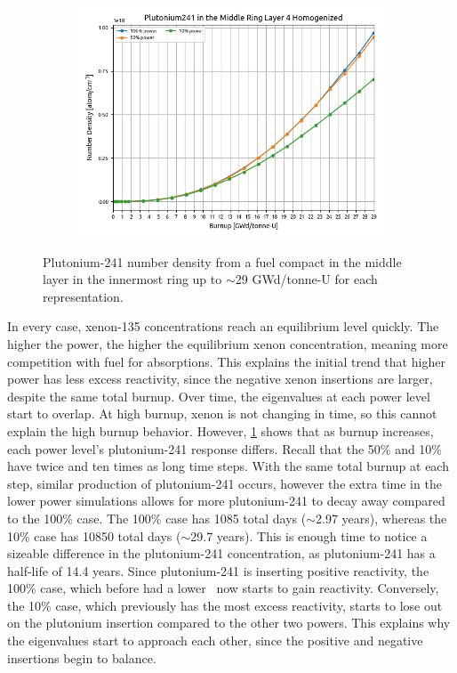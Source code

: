 \documentclass[letterpaper]{physor2024}
\begin{document}
\begin{figure}[!h]
\begin{subfigure}{0.495\linewidth}
        \includegraphics[width=\linewidth]{figures/homogenized_Pu_241.png}
    \end{subfigure}
    \caption{Plutonium-241 number density from a fuel compact in the middle layer in the innermost ring up to $\sim$29 GWd/tonne-U for each representation.}
    \vspace*{-0.2cm}
    \label{fig:plutoniums}
\end{figure}

In every case, xenon-135 concentrations reach an equilibrium level quickly. The higher the power, the higher the equilibrium xenon concentration, meaning more competition with fuel for absorptions. This explains the initial trend that higher power has less excess reactivity, since the negative xenon insertions are larger, despite the same total burnup. Over time, the eigenvalues at each power level start to overlap. At high burnup, xenon is not changing in time, so this cannot explain the high burnup behavior. However, \cref{fig:plutoniums} shows that as burnup increases, each power level's plutonium-241 response differs. Recall that the 50\% and 10\% have twice and ten times as long time steps. With the same total burnup at each step, similar production of plutonium-241 occurs, however the extra time in the lower power simulations allows for more plutonium-241 to decay away compared to the 100\% case. The 100\% case has 1085 total days ($\sim$2.97 years), whereas the 10\% case has 10850 total days ($\sim$29.7 years). This is enough time to notice a sizeable difference in the plutonium-241 concentration, as plutonium-241 has a half-life of 14.4 years. Since plutonium-241 is inserting positive reactivity, the 100\% case, which before had a lower \kinf~now starts to gain reactivity. Conversely, the 10\% case, which previously has the most excess reactivity, starts to lose out on the plutonium insertion compared to the other two powers. This explains why the eigenvalues start to approach each other, since the positive and negative insertions begin to balance.
\end{document}
